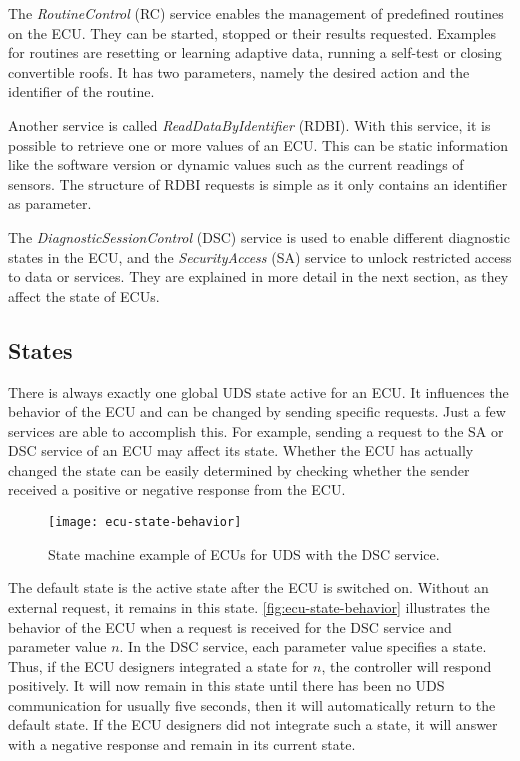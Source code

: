 The \emph{RoutineControl} (RC) service enables the management of predefined routines on the ECU. They can be started, stopped or their results requested. Examples for routines are resetting or learning adaptive data, running a self-test or closing convertible roofs. It has two parameters, namely the desired action and the identifier of the routine.

Another service is called \emph{ReadDataByIdentifier} (RDBI). With this service, it is possible to retrieve one or more values of an ECU. This can be static information like the software version or dynamic values such as the current readings of sensors. The structure of RDBI requests is simple as it only contains an identifier as parameter.

The \emph{DiagnosticSessionControl} (DSC) service is used to enable different diagnostic states in the ECU, and the \emph{SecurityAccess} (SA) service to unlock restricted access to data or services. They are explained in more detail in the next section, as they affect the state of ECUs.

\subsection{States}
\label{subsec:states}

There is always exactly one global UDS state active for an ECU. It influences the behavior of the ECU and can be changed by sending specific requests. Just a few services are able to accomplish this. For example, sending a request to the SA or DSC service of an ECU may affect its state. Whether the ECU has actually changed the state can be easily determined by checking whether the sender received a positive or negative response from the ECU.

\begin{figure}[htb]
    \centering
    \texttt{[image: ecu-state-behavior]}
    \caption{State machine example of ECUs for UDS with the DSC service.}
    \label{fig:ecu-state-behavior}
\end{figure}

The default state is the active state after the ECU is switched on. Without an external request, it remains in this state. \autoref{fig:ecu-state-behavior} illustrates the behavior of the ECU when a request is received for the DSC service and parameter value $n$. In the DSC service, each parameter value specifies a state. Thus, if the ECU designers integrated a state for $n$, the controller will respond positively. It will now remain in this state until there has been no UDS communication for usually five seconds, then it will automatically return to the default state. If the ECU designers did not integrate such a state, it will answer with a negative response and remain in its current state.

